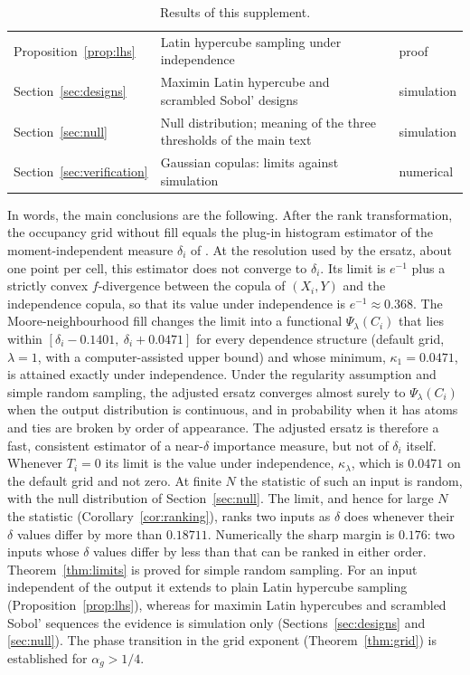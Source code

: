 \documentclass[11pt,a4paper]{article}
\theoremstyle{definition}
\theoremstyle{remark}
\begin{document}
\begin{table}[h]
\begin{tabular}{@{}>{\raggedright\arraybackslash}p{2.9cm}>{\raggedright\arraybackslash}p{8.1cm}>{\raggedright\arraybackslash}p{4.1cm}@{}}
Proposition~\ref{prop:lhs} & Latin hypercube sampling under independence & proof\\
Section~\ref{sec:designs} & Maximin Latin hypercube and scrambled Sobol' designs & simulation\\
Section~\ref{sec:null} & Null distribution; meaning of the three thresholds of the main text & simulation\\
Section~\ref{sec:verification} & Gaussian copulas: limits against simulation & numerical\\
\bottomrule
\end{tabular}
\caption{Results of this supplement.}
\label{tab:results}
\end{table}

In words, the main conclusions are the following. After the rank transformation, the occupancy grid without fill equals the plug-in histogram estimator of the moment-independent measure $\delta_i$ of \citet{borgonovo2007}. At the resolution used by the ersatz, about one point per cell, this estimator does not converge to $\delta_i$. Its limit is $e^{-1}$ plus a strictly convex $f$-divergence between the copula of $(X_i,Y)$ and the independence copula, so that its value under independence is $e^{-1}\approx0.368$. The Moore-neighbourhood fill changes the limit into a functional $\Psi_\lambda(C_i)$ that lies within $[\delta_i-0.1401,\ \delta_i+0.0471]$ for every dependence structure (default grid, $\lambda=1$, with a computer-assisted upper bound) and whose minimum, $\kappa_1=0.0471$, is attained exactly under independence. Under the regularity assumption and simple random sampling, the adjusted ersatz converges almost surely to $\Psi_\lambda(C_i)$ when the output distribution is continuous, and in probability when it has atoms and ties are broken by order of appearance. The adjusted ersatz is therefore a fast, consistent estimator of a near-$\delta$ importance measure, but not of $\delta_i$ itself. Whenever $T_i=0$ its limit is the value under independence, $\kappa_\lambda$, which is $0.0471$ on the default grid and not zero. At finite $N$ the statistic of such an input is random, with the null distribution of Section~\ref{sec:null}. The limit, and hence for large $N$ the statistic (Corollary~\ref{cor:ranking}), ranks two inputs as $\delta$ does whenever their $\delta$ values differ by more than $0.18711$. Numerically the sharp margin is $0.176$: two inputs whose $\delta$ values differ by less than that can be ranked in either order. Theorem~\ref{thm:limits} is proved for simple random sampling. For an input independent of the output it extends to plain Latin hypercube sampling (Proposition~\ref{prop:lhs}), whereas for maximin Latin hypercubes and scrambled Sobol' sequences the evidence is simulation only (Sections~\ref{sec:designs} and \ref{sec:null}). The phase transition in the grid exponent (Theorem~\ref{thm:grid}) is established for $\alpha_g>1/4$.
\end{document}
